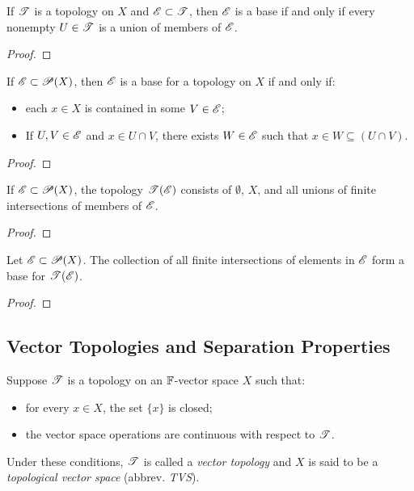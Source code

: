 \begin{proposition}
	If $\mathscr{T}$ is a topology on $X$ and $\mathscr{E} \subset \mathscr{T}$, then $\mathscr{E}$ is a base if and only if every nonempty $U \in \mathscr{T}$ is a union of members of $\mathscr{E}$.
\end{proposition}
	{\color{red}
	\begin{proof}
			
	\end{proof}}

\begin{proposition}
	If $\mathscr{E} \subset \mathscr{P}(X)$, then $\mathscr{E}$ is a base for a topology on $X$ if and only if:
	\mbox{}
	\begin{itemize}[itemsep=1pt,topsep=3pt]
		\item each $x \in X$ is contained in some $V \in \mathscr{E}$;
		\item If $U,V \in \mathscr{E}$ and $x \in U \cap V$, there exists $W \in \mathscr{E}$ such that $x \in W \subseteq (U \cap V)$.
	\end{itemize}
\end{proposition}
	{\color{red}
	\begin{proof}
			
	\end{proof}}


\begin{proposition}
	If $\mathscr{E} \subset \mathscr{P}(X)$, the topology $\mathscr{T}(\mathscr{E})$ consists of $\emptyset$, $X$, and all unions of finite intersections of members of $\mathscr{E}$.
\end{proposition}
	{\color{red}
	\begin{proof}
			
	\end{proof}}

\begin{proposition}
	Let $\mathscr{E} \subset \mathscr{P}(X)$. The collection of all finite intersections of elements in $\mathscr{E}$ form a base for $\mathscr{T}(\mathscr{E})$.
\end{proposition}
	{\color{red}
	\begin{proof}
			
	\end{proof}}


\subsection{Vector Topologies and Separation Properties}
\begin{definition}
	Suppose $\mathscr{T}$ is a topology on an $\mathbb{F}$-vector space $X$ such that:
	\mbox{}
	\begin{itemize}[itemsep=1pt,topsep=3pt]
		\item for every $x \in X$, the set $\{x\}$ is closed;
		\item the vector space operations are continuous with respect to $\mathscr{T}$.
	\end{itemize}
	Under these conditions, $\mathscr{T}$ is called a \emph{vector topology} and $X$ is said to be a \emph{topological vector space} (abbrev. \emph{TVS}).
\end{definition}

